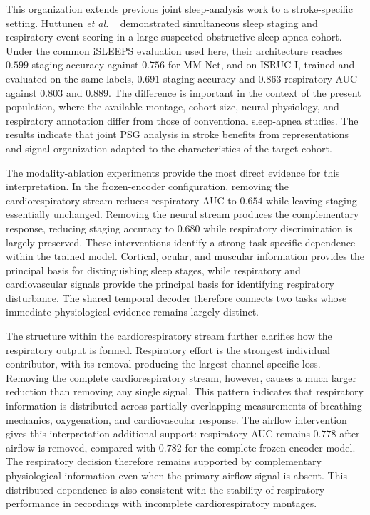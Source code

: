 \documentclass[a4paper,fleqn]{cas-sc}
\newcommand{\mmAccS}{0.756}
\begin{document}
This organization extends previous joint sleep-analysis work to a
stroke-specific setting. Huttunen \emph{et al.}
~\cite{huttunen2023simultaneous} demonstrated simultaneous sleep staging and
respiratory-event scoring in a large suspected-obstructive-sleep-apnea cohort.
Under the common iSLEEPS evaluation used here, their architecture reaches
$0.599$ staging accuracy against $\mmAccS$ for MM-Net, and on ISRUC-I, trained and evaluated on
the same labels, $0.691$ staging accuracy and $0.863$ respiratory AUC against $0.803$ and $0.889$. The difference is important in the context of the present
population, where the available montage, cohort size, neural physiology, and
respiratory annotation differ from those of conventional sleep-apnea studies.
The results indicate that joint PSG analysis in stroke benefits from
representations and signal organization adapted to the characteristics of the
target cohort.

The modality-ablation experiments provide the most direct evidence for this interpretation. In the frozen-encoder configuration, removing the cardiorespiratory stream
reduces respiratory AUC to $0.654$ while leaving staging essentially unchanged. Removing the neural
stream produces the complementary response, reducing staging accuracy to
$0.680$ while respiratory discrimination is largely preserved. These
interventions identify a strong task-specific dependence within the trained
model. Cortical, ocular, and muscular information provides the principal basis
for distinguishing sleep stages, while respiratory and cardiovascular signals
provide the principal basis for identifying respiratory disturbance. The
shared temporal decoder therefore connects two tasks whose immediate
physiological evidence remains largely distinct.

The structure within the cardiorespiratory stream further clarifies how the
respiratory output is formed. Respiratory effort is the strongest individual
contributor, with its removal producing the largest channel-specific loss.
Removing the complete cardiorespiratory stream, however, causes a much larger
reduction than removing any single signal. This pattern indicates that
respiratory information is distributed across partially overlapping
measurements of breathing mechanics, oxygenation, and cardiovascular response.
The airflow intervention gives this interpretation additional support:
respiratory AUC remains $0.778$ after airflow is removed, compared with $0.782$
for the complete frozen-encoder model. The respiratory decision therefore remains supported by
complementary physiological information even when the primary airflow signal is
absent. This distributed dependence is also consistent with the stability of
respiratory performance in recordings with incomplete cardiorespiratory
montages.
\end{document}

